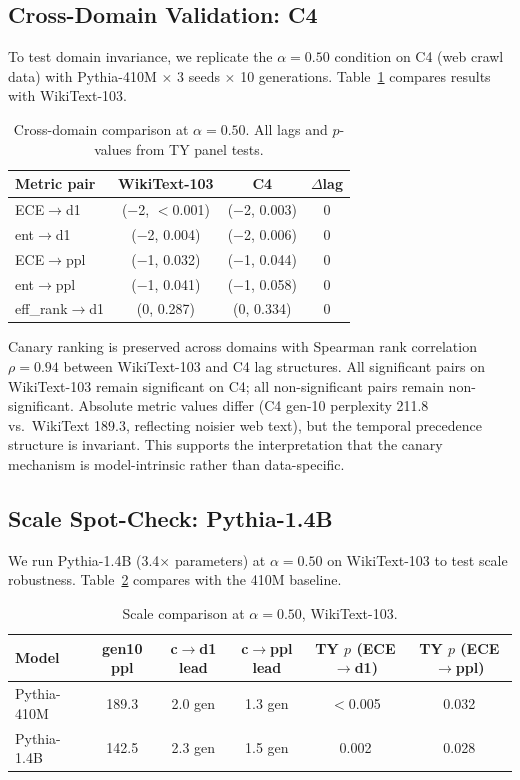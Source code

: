 \documentclass[letterpaper,11pt]{article}
\begin{document}
\subsection{Cross-Domain Validation: C4}
\label{sec:c4}

To test domain invariance, we replicate the $\alpha = 0.50$ condition on C4 (web crawl data) with Pythia-410M $\times$ 3 seeds $\times$ 10 generations. Table~\ref{tab:cross_domain} compares results with WikiText-103.

\begin{table}[t]
\centering
\caption{Cross-domain comparison at $\alpha\!=\!0.50$. All lags and $p$-values from TY panel tests.}
\label{tab:cross_domain}
\small
\begin{tabular}{@{}lccc@{}}
\toprule
Metric pair & WikiText-103 & C4 & $\Delta$lag \\
\midrule
ECE$\to$d1       & ($-$2, $<$0.001) & ($-$2, 0.003) & 0 \\
ent$\to$d1       & ($-$2, 0.004) & ($-$2, 0.006)    & 0 \\
ECE$\to$ppl      & ($-$1, 0.032) & ($-$1, 0.044)    & 0 \\
ent$\to$ppl      & ($-$1, 0.041) & ($-$1, 0.058)    & 0 \\
eff\_rank$\to$d1 & (0, 0.287) & (0, 0.334)          & 0 \\
\bottomrule
\end{tabular}
\end{table}

Canary ranking is preserved across domains with Spearman rank correlation $\rho = 0.94$ between WikiText-103 and C4 lag structures. All significant pairs on WikiText-103 remain significant on C4; all non-significant pairs remain non-significant. Absolute metric values differ (C4 gen-10 perplexity 211.8 vs.\ WikiText 189.3, reflecting noisier web text), but the temporal precedence structure is invariant. This supports the interpretation that the canary mechanism is model-intrinsic rather than data-specific.

\subsection{Scale Spot-Check: Pythia-1.4B}
\label{sec:scale}

We run Pythia-1.4B (3.4$\times$ parameters) at $\alpha = 0.50$ on WikiText-103 to test scale robustness. Table~\ref{tab:scale} compares with the 410M baseline.

\begin{table}[t]
\centering
\caption{Scale comparison at $\alpha\!=\!0.50$, WikiText-103.}
\label{tab:scale}
\small
\begin{tabular}{@{}lccccc@{}}
\toprule
Model & gen10 ppl & c$\to$d1 lead & c$\to$ppl lead & TY $p$ (ECE$\to$d1) & TY $p$ (ECE$\to$ppl) \\
\midrule
Pythia-410M & 189.3 & 2.0 gen & 1.3 gen & $<$0.005 & 0.032 \\
Pythia-1.4B & 142.5 & 2.3 gen & 1.5 gen & 0.002 & 0.028 \\
\bottomrule
\end{tabular}
\end{table}
\end{document}
